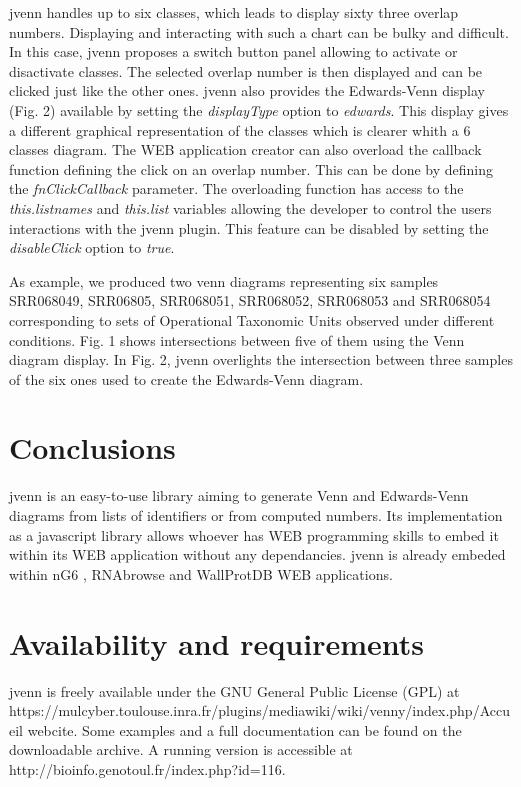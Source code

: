 \documentclass{bmcart}
\begin{document}
jvenn handles up to six classes, which leads to display sixty three overlap numbers. Displaying and interacting with such a chart
can be bulky and difficult. In this case, jvenn proposes a switch button panel allowing to activate or disactivate classes. 
The selected overlap number is then displayed and can be clicked just like the other ones. jvenn also provides the Edwards-Venn
display (Fig. 2) available by setting the \textit{displayType} option to \textit{edwards}. This display gives a different 
graphical representation of the classes which is clearer whith a 6 classes diagram.
The WEB application creator can also overload the callback function defining the click on an overlap number. This can be done 
by defining the \textit{fnClickCallback} parameter. The overloading function has access to the \textit{this.listnames} and
\textit{this.list} variables allowing the developer to control the users interactions with the jvenn plugin. This feature can
be disabled by setting the \textit{disableClick} option to \textit{true}.

As example, we produced two venn diagrams representing six samples SRR068049, SRR06805, SRR068051, SRR068052, SRR068053 and 
SRR068054 corresponding to sets of Operational Taxonomic Units observed under different conditions. Fig. 1 shows intersections
between five of them using the Venn diagram display. In Fig. 2, jvenn overlights the intersection between three samples of the 
six ones used to create the Edwards-Venn diagram.


\section*{Conclusions}

jvenn is an easy-to-use library aiming to generate Venn and Edwards-Venn diagrams from lists of identifiers or from
computed numbers. Its implementation as a javascript library allows whoever has WEB programming skills to embed it 
within its WEB application without any dependancies. jvenn is already embeded within nG6 \cite{Mariette2012}, RNAbrowse 
\cite{Mariette} and WallProtDB \cite{SanClemente} WEB applications.

\section*{Availability and requirements}

jvenn is freely available under the GNU General Public License (GPL) at 
https://mulcyber.toulouse.inra.fr/plugins/mediawiki/wiki/venny/index.php/Accueil webcite. Some examples and a full documentation 
can be found on the downloadable archive. A running version is accessible at http://bioinfo.genotoul.fr/index.php?id=116.
\end{document}
